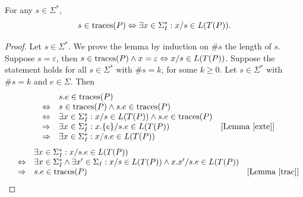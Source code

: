 \begin{lemma}\label{cont}
For any $s\in \Sigma^*$,
$$s\in \text{traces}(P) \Leftrightarrow \exists x\in \Sigma_I^*: x/s \in L(T(P)).$$
\end{lemma}
%
\begin{proof}
Let $s\in \Sigma^*$. We prove the lemma by induction on $\#s$ the length of $s$. Suppose $s=\varepsilon $, then $s\in \text{traces}(P)\wedge x=\varepsilon \Leftrightarrow x/s\in L(T(P))$. Suppose the statement holds for all $s\in \Sigma^*$ with $\#s=k$, for some $k\ge 0$. Let $s\in \Sigma^*$ with $\#s=k$ and $e\in\Sigma$.
Then \[\begin{array}{llll}
&& s.e\in \text{traces}(P)\\
&\Leftrightarrow & s\in \text{traces}(P)\wedge s.e\in \text{traces}(P)\\
&\Leftrightarrow &  \exists x\in \Sigma_I^*: x/s\in L(T(P))\wedge s.e\in \text{traces}(P)\\
&\Rightarrow & \exists x\in \Sigma_I^*: x.\{e\}/s.e\in L(T(P))&[{\text{Lemma~\ref{exte}}}]\\
&\Rightarrow & \exists x\in \Sigma_I^*: x/s.e\in L(T(P))
\end{array}
\]
 \[\begin{array}{llll}
&& \exists x\in \Sigma_I^*: x/s.e\in L(T(P))\\
&\Leftrightarrow & \exists x\in \Sigma_I^*\wedge \exists x'\in \Sigma_I: x/s\in L(T(P))\wedge x.x'/s.e\in L(T(P))\\
&\Rightarrow & s.e\in \text{traces}(P)&[{\text{Lemma~\ref{trac}}}]\\
\end{array}
\]
\end{proof}

